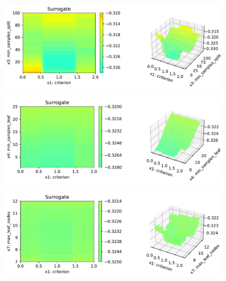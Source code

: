 \documentclass[
  letterpaper,
  DIV=11,
  numbers=noendperiod]{scrreprt}
\begin{document}
\begin{figure}[H]

{\centering \includegraphics{16_spot_hpt_sklearn_multiclass_classification_randomforest_files/figure-pdf/cell-49-output-6.pdf}

}

\end{figure}

\begin{figure}[H]

{\centering \includegraphics{16_spot_hpt_sklearn_multiclass_classification_randomforest_files/figure-pdf/cell-49-output-7.pdf}

}

\end{figure}

\begin{figure}[H]

{\centering \includegraphics{16_spot_hpt_sklearn_multiclass_classification_randomforest_files/figure-pdf/cell-49-output-8.pdf}

}

\end{figure}
\end{document}
